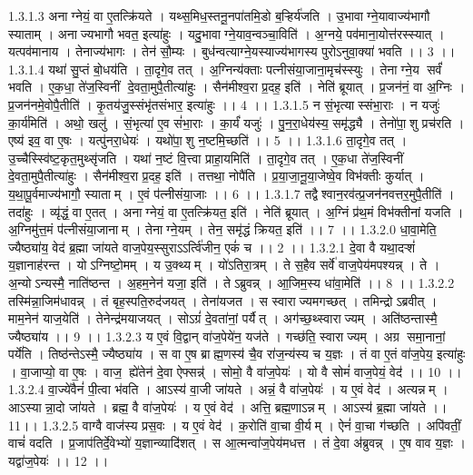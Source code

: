 1.3.1.3
अनाग्नेयं॒ वा ए॒तत्क्रि॑यते । यथ्स॒मिध॒स्तनू॒नपा॑तमि॒डो ब॒ऱ्हिर्य॑जति । उ॒भावाग्ने॒यावाज्य॑भागौ स्याताम् । अनाज्यभागौ भवत॒ इत्या॑हुः । यदु॒भावाग्ने॒याव॒न्वञ्चा॒विति॑ । अ॒ग्नये॒ पव॑माना॒योत्त॑रस्स्यात् । यत्पव॑मानाय । तेनाज्य॑भागः । तेन॑ सौ॒म्यः । बुध॑न्वत्याग्ने॒यस्याज्य॑भागस्य पुरोऽनुवा॒क्या॑ भवति ।। 3 ।।
1.3.1.4
यथा॑ सु॒प्तं बो॒धय॑ति । ता॒दृगे॒व तत् । अ॒ग्निन्य॑क्ताः पत्नीसंया॒जाना॒मृच॑स्स्युः । तेनाग्ने॒य सर्वं॑ भवति । ए॒क॒धा॒ ते॑ज॒स्विनीं दे॒वता॒मुपै॒तीत्या॑हुः । सैन॑मीश्व॒रा प्र॒दह॒ इति॑ । नेति॑ ब्रूयात् । प्र॒जन॑नं॒ वा अ॒ग्निः । प्र॒जन॑नमे॒वोपै॒तीति॑ । कृ॒तय॑जु॒स्संभृ॑तसंभार॒ इत्या॑हुः ।। 4 ।।
1.3.1.5
न सं॒भृत्यास्संभा॒राः । न यजुः॑ का॒र्य॑मिति॑ । अथो॒ खलु॑ । सं॒भृत्या॑ ए॒व सं॑भा॒राः । का॒र्यं॑ यजुः॑ । पु॒न॒रा॒धेय॑स्य॒ समृ॑द्ध्यै । तेनो॑पा॒॒शु प्रच॑रति । एष्य॑ इव॒ वा ए॒षः । यत्पु॑नरा॒धेयः॑ । यथो॑पा॒॒शु न॒ष्टमि॒च्छति॑ ।। 5 ।।
1.3.1.6
ता॒दृगे॒व तत् । उ॒च्चैस्स्वि॑ष्ट॒कृत॒मुथ्सृ॑जति । यथा॑ न॒ष्टं वि॒त्त्वा प्राहा॒यमिति॑ । ता॒दृगे॒व तत् । ए॒क॒धा ते॑ज॒स्विनीं दे॒वता॒मुपै॒तीत्या॑हुः । सैन॑मीश्व॒रा प्र॒दह॒ इति॑ । तत्तथा॒ नोपै॑ति । प्र॒या॒जा॒नू॒या॒जेष्वे॒व विभ॑क्तीः कुर्यात् । य॒था॒पू॒र्वमाज्य॑भागौ॒ स्याताम् । ए॒वं प॑त्नीसंया॒जाः ।। 6 ।।
1.3.1.7
तद्वैश्वान॒रव॑त्प्र॒जन॑नवत्तर॒मुपै॒तीति॑ । तदा॑हुः । व्यृ॑द्धं॒ वा ए॒तत् । अनाग्नेयं॒ वा ए॒तत्क्रि॑यत॒ इति॑ । नेति॑ ब्रूयात् । अ॒ग्निं प्र॑थ॒मं विभ॑क्तीनां यजति । अ॒ग्निमु॑त्त॒मं प॑त्नीसंया॒जानाम् । तेनाग्ने॒यम् । तेन॒ समृ॑द्धं क्रियत॒ इति॑ ।। 7 ।।
1.3.2.0
धा॒वा॒मेति॒ ज्यैष्ठ्या॑य॒ वेद॑ ब्र॒ह्मा जा॑यते वाज॒पेय॒स्सुराऽऽर्त्वि॑जीन॒ एकं॑ च ।। 2 ।।
1.3.2.1
दे॒वा वै यथा॒दऱ्शं॑ य॒ज्ञानाह॑रन्त । योऽग्निष्टो॒मम् । य उ॒क्थ्यम् । यो॑ऽतिरा॒त्रम् । ते स॒हैव सर्वे॑ वाज॒पेय॑मपश्यन्न् । ते । अ॒न्योऽन्यस्मै॒ नाति॑ष्ठन्त । अ॒हम॒नेन॑ यजा॒ इति॑ । तेऽब्रुवन्न् । आ॒जिम॒स्य धा॑वा॒मेति॑ ।। 8 ।।
1.3.2.2
तस्मि॑न्ना॒जिम॑धावन्न् । तं बृह॒स्पति॒रुद॑जयत् । तेना॑यजत । स स्वाराज्यमगच्छत् । तमिन्द्रोऽब्रवीत् । माम॒नेन॑ याज॒येति॑ । तेनेन्द्र॑मयाजयत् । सोऽग्रं॑ दे॒वता॑नां॒ पर्यैत् । अग॑च्छ॒थ्स्वाराज्यम् । अति॑ष्ठन्तास्मै॒ ज्यैष्ठ्या॑य ।। 9 ।।
1.3.2.3
य ए॒वं वि॒द्वान् वा॑ज॒पेये॑न॒ यज॑ते । गच्छ॑ति॒ स्वाराज्यम् । अग्र॑ समा॒नानां॒ पर्ये॑ति । तिष्ठ॑न्तेऽस्मै॒ ज्यैष्ठ्या॑य । स वा ए॒ष ब्राह्म॒णस्य॑ चै॒व रा॑ज॒न्य॑स्य च य॒ज्ञः । तं वा ए॒तं वा॑ज॒पेय॒ इत्या॑हुः । वा॒जाप्यो॒ वा ए॒षः । वाज॒॒ ह्ये॑तेन॑ दे॒वा ऐफ्सन्न्॑ । सोमो॒ वै वा॑ज॒पेयः॑ । यो वै सोमं॑ वाज॒पेयं॒ वेद॑ ।। 10 ।।
1.3.2.4
वा॒ज्ये॑वैनं॑ पी॒त्वा भ॑वति । आऽस्य॑ वा॒जी जा॑यते । अन्नं॒ वै वा॑ज॒पेयः॑ । य ए॒वं वेद॑ । अत्यन्नम् । आऽस्यान्ना॒दो जा॑यते । ब्रह्म॒ वै वा॑ज॒पेयः॑ । य ए॒वं वेद॑ । अत्ति॒ ब्रह्म॒णाऽन्नम् । आऽस्य॑ ब्र॒ह्मा जा॑यते ।।11।।
1.3.2.5
वाग्वै वाज॑स्य प्रस॒वः । य ए॒वं वेद॑ । क॒रोति॑ वा॒चा वी॒र्यम् । ऐनं॑ वा॒चा ग॑च्छति । अपि॑वतीं॒ वाचं॑ वदति । प्र॒जाप॑तिर्दे॒वेभ्यो॑ य॒ज्ञान्व्यादि॑शत् । स आ॒त्मन्वा॑ज॒पेय॑मधत्त । तं दे॒वा अ॑ब्रुवन्न् । ए॒ष वाव य॒ज्ञः । यद्वा॑ज॒पेयः॑ ।। 12 ।।
